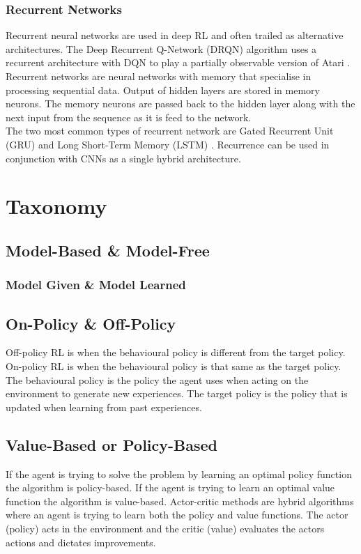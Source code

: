 \documentclass[10pt,journal,compsoc]{IEEEtran}
\begin{document}
\subsubsection{Recurrent Networks}
Recurrent neural networks are used in deep RL and often trailed as alternative architectures. The Deep Recurrent Q-Network (DRQN) algorithm uses a recurrent architecture with DQN to play a partially observable version of Atari \cite{Haus:DRQN}. 
\\
Recurrent networks are neural networks with memory that specialise in processing sequential data. Output of hidden layers are stored in memory neurons. The memory neurons are passed back to the hidden layer along with the next input from the sequence as it is feed to the network.
\\
The two most common types of recurrent network are Gated Recurrent Unit (GRU) \cite{chung2014empirical} and Long Short-Term Memory (LSTM) \cite{chung2014empirical}. Recurrence can be used in conjunction with CNNs as a single hybrid architecture.

\section{Taxonomy}
\subsection{Model-Based \& Model-Free}
\subsubsection{Model Given \& Model Learned}
\subsection{On-Policy \& Off-Policy}
Off-policy RL is when the behavioural policy is different from the target policy. On-policy RL is when the behavioural policy is that same as the target policy. The behavioural policy is the policy the agent uses when acting on the environment to generate new experiences. The target policy is the policy that is updated when learning from past experiences.
\subsection{Value-Based or Policy-Based}
If the agent is trying to solve the problem by learning an optimal policy function the algorithm is policy-based. If the agent is trying to learn an optimal value function the algorithm is value-based. Actor-critic methods are hybrid algorithms where an agent is trying to learn both the policy and value functions. The actor (policy) acts in the environment and the critic (value) evaluates the actors actions and dictates improvements.
\end{document}
